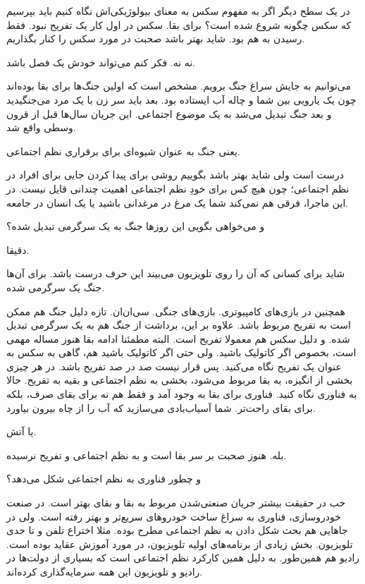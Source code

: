 \begin{dialogue}
\linus
در یک سطح دیگر اگر به مفهوم سکس به معنای بیولوژیکی‌اش نگاه
کنیم باید بپرسیم که سکس چگونه شروع شده است؟ برای بقا. سکس در اول کار
یک تفریح نبود. فقط رسیدن به هم بود. شاید بهتر باشد صحبت در مورد سکس را
کنار بگذاریم.

\david
نه نه. فکر کنم می‌تواند خودش یک فصل باشد.

\linus
می‌توانیم به جایش سراغ جنگ برویم. مشخص است که اولین جنگ‌ها
برای بقا بوده‌اند چون یک یارویی بین شما و چاله آب ایستاده بود. بعد باید
سر زن با یک مرد می‌جنگیدید و بعد جنگ تبدیل می‌شد به یک موضوع
اجتماعی. این جریان سال‌ها قبل از قرون وسطی واقع شد.

\david
یعنی جنگ به عنوان شیوه‌ای برای برقراری نظم اجتماعی.

\linus
درست است ولی شاید بهتر باشد بگوییم روشی برای پیدا کردن جایی برای افراد در نظم اجتماعی؛ چون هیچ کس برای خودِ نظم اجتماعی اهمیت چندانی قایل نیست. در این ماجرا، فرقی هم نمی‌کند شما یک مرغ در مرغدانی باشید یا یک انسان در جامعه. 

\david
و می‌خواهی بگویی این روزها جنگ به یک سرگرمی تبدیل شده؟

\linus
دقیقا.

\david
شاید برای کسانی که آن را روی تلویزیون می‌بیند این حرف درست
باشد. برای آن‌ها جنگ یک سرگرمی شده.

\linus
همچنین در بازی‌های کامپیوتری. بازی‌های جنگی. سی‌ان‌ان. تازه
دلیل جنگ هم ممکن است به تفریح مربوط باشد. علاوه بر این، برداشت از جنگ
هم به یک سرگرمی تبدیل شده. و دلیل سکس هم معمولا تفریح است. البته
مطمئنا ادامه بقا هنوز مساله مهمی است، بخصوص اگر کاتولیک باشید. ولی حتی
اگر کاتولیک باشید هم، گاهی به سکس به عنوان یک تفریح نگاه می‌کنید. پس
قرار نیست صد در صد تفریح باشد. در هر چیزی بخشی از انگیزه، به بقا مربوط
می‌شود، بخشی به نظم اجتماعی و بقیه به تفریح. حالا به فناوری نگاه
کنید. فناوری برای بقا به وجود آمد و فقط هم نه برای بقای صرف، بلکه برای
بقای راحت‌تر. شما آسیاب‌بادی می‌سازید که آب را از چاه بیرون بیاورد.

\david
یا آتش.

\linus
بله. هنوز صحبت بر سر بقا است و به نظم اجتماعی و تفریح
نرسیده.

\david
و چطور فناوری به نظم اجتماعی شکل می‌دهد؟

\linus
خب در حقیقت بیشتر جریان صنعتی‌شدن مربوط به بقا و بقای بهتر
است. در صنعت خودروسازی، فناوری به سراغ ساخت خودروهای سریع‌تر و بهتر
رفته است. ولی در جاهایی هم بحث شکل دادن به نظم اجتماعی مطرح بوده. مثلا
اختراع تلفن و تا حدی تلویزیون. بخش زیادی از برنامه‌های اولیه تلویزیون،
در مورد آموزش‌ عقاید بوده است. رادیو هم همین‌طور. به دلیل همین کارکرد
نظم اجتماعی است که بسیاری از دولت‌ها در رادیو و تلویزیون این همه
سرمایه‌گذاری کرده‌اند.


\end{dialogue}
